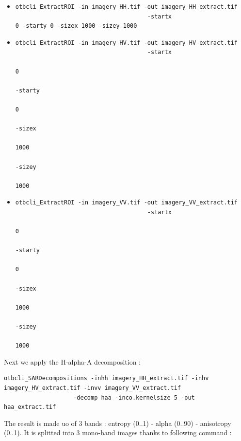 \begin{itemize}
\item 
\begin{verbatim} 
otbcli_ExtractROI -in imagery_HH.tif -out imagery_HH_extract.tif  
									  -startx
0 -starty 0 -sizex 1000 -sizey 1000 
\end{verbatim}
									  
\item 
\begin{verbatim} 
otbcli_ExtractROI -in imagery_HV.tif -out imagery_HV_extract.tif  
									  -startx
                                                                          0
                                                                          -starty
                                                                          0
                                                                          -sizex
                                                                          1000
                                                                          -sizey
                                                                          1000 
\end{verbatim}
									  
\item 
\begin{verbatim} 
otbcli_ExtractROI -in imagery_VV.tif -out imagery_VV_extract.tif  
									  -startx
                                                                          0
                                                                          -starty
                                                                          0
                                                                          -sizex
                                                                          1000
                                                                          -sizey
                                                                          1000 
\end{verbatim}
\end{itemize}

Next we apply the H-alpha-A decomposition :

\begin{verbatim} 
otbcli_SARDecompositions -inhh imagery_HH_extract.tif -inhv imagery_HV_extract.tif -invv imagery_VV_extract.tif 
					-decomp haa -inco.kernelsize 5 -out
haa_extract.tif 
\end{verbatim}

The result is made uo of 3 bands : entropy (0..1) - alpha (0..90) - anisotropy (0..1). 
It is splitted into 3 mono-band images thanks to following command :

